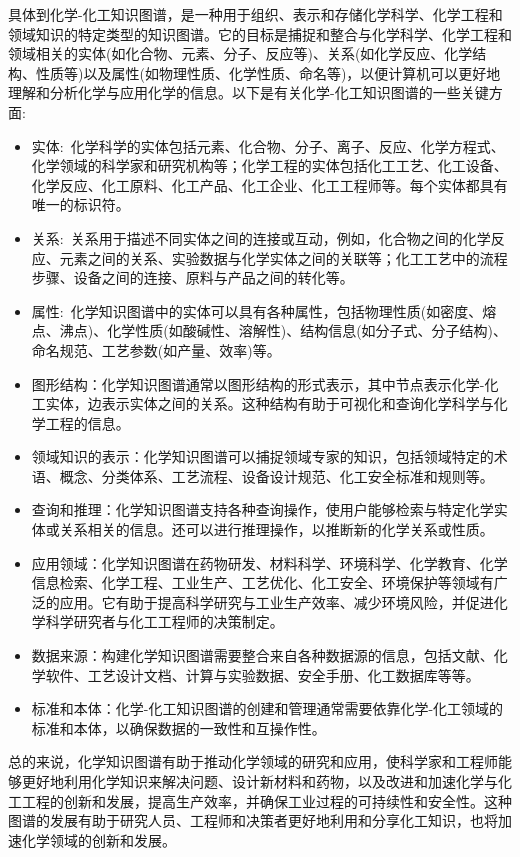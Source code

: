 具体到化学-化工知识图谱，是一种用于组织、表示和存储化学科学、化学工程和领域知识的特定类型的知识图谱。它的目标是捕捉和整合与化学科学、化学工程和领域相关的实体(如化合物、元素、分子、反应等)、关系(如化学反应、化学结构、性质等)以及属性(如物理性质、化学性质、命名等)，以便计算机可以更好地理解和分析化学与应用化学的信息。以下是有关化学-化工知识图谱的一些关键方面: 
\begin{itemize}
	\item 实体:~化学科学的实体包括元素、化合物、分子、离子、反应、化学方程式、化学领域的科学家和研究机构等；化学工程的实体包括化工工艺、化工设备、化学反应、化工原料、化工产品、化工企业、化工工程师等。每个实体都具有唯一的标识符。
	\item 关系:~关系用于描述不同实体之间的连接或互动，例如，化合物之间的化学反应、元素之间的关系、实验数据与化学实体之间的关联等；化工工艺中的流程步骤、设备之间的连接、原料与产品之间的转化等。
	\item 属性:~化学知识图谱中的实体可以具有各种属性，包括物理性质(如密度、熔点、沸点)、化学性质(如酸碱性、溶解性)、结构信息(如分子式、分子结构)、命名规范、工艺参数(如产量、效率)等。
	\item 图形结构：化学知识图谱通常以图形结构的形式表示，其中节点表示化学-化工实体，边表示实体之间的关系。这种结构有助于可视化和查询化学科学与化学工程的信息。
	\item 领域知识的表示：化学知识图谱可以捕捉领域专家的知识，包括领域特定的术语、概念、分类体系、工艺流程、设备设计规范、化工安全标准和规则等。
	\item 查询和推理：化学知识图谱支持各种查询操作，使用户能够检索与特定化学实体或关系相关的信息。还可以进行推理操作，以推断新的化学关系或性质。
	\item 应用领域：化学知识图谱在药物研发、材料科学、环境科学、化学教育、化学信息检索、化学工程、工业生产、工艺优化、化工安全、环境保护等领域有广泛的应用。它有助于提高科学研究与工业生产效率、减少环境风险，并促进化学科学研究者与化工工程师的决策制定。
	\item 数据来源：构建化学知识图谱需要整合来自各种数据源的信息，包括文献、化学软件、工艺设计文档、计算与实验数据、安全手册、化工数据库等等。
	\item 标准和本体：化学-化工知识图谱的创建和管理通常需要依靠化学-化工领域的标准和本体，以确保数据的一致性和互操作性。
\end{itemize} 
总的来说，化学知识图谱有助于推动化学领域的研究和应用，使科学家和工程师能够更好地利用化学知识来解决问题、设计新材料和药物，以及改进和加速化学与化工工程的创新和发展，提高生产效率，并确保工业过程的可持续性和安全性。这种图谱的发展有助于研究人员、工程师和决策者更好地利用和分享化工知识，也将加速化学领域的创新和发展。

